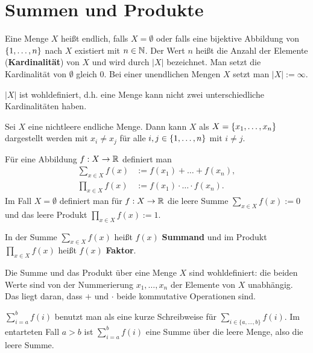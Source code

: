 \section{Summen und Produkte}

\begin{defn} 
Eine Menge $ X $ heißt endlich, falls $ X = \emptyset $ oder falls eine bijektive Abbildung von $ \{ 1,\ldots,n \} $ nach $ X $ existiert mit $ n \in \mathbb{N} $. Der Wert $ n $ heißt die Anzahl der Elemente (\textbf{Kardinalität}) von $ X $ und wird durch $ |X| $ bezeichnet. Man setzt die Kardinalität von $ \emptyset $ gleich 0. Bei einer unendlichen Mengen $X$ setzt man $|X| := \infty$. 
\end{defn} 

\begin{bem}
$ |X| $ ist wohldefiniert, d.h. eine Menge kann nicht zwei unterschiedliche Kardinalitäten haben.
\end{bem} 

\begin{defn}
Sei $ X $ eine nichtleere endliche Menge. Dann kann $ X $ als $ X = \{ x_1,\ldots,x_n \} $ dargestellt werden mit  $ x_i \neq x_j $ für alle $ i,j \in \{ 1,\ldots,n \} $ mit $i \ne j$. 

Für eine Abbildung $ f : X \to \mathbb{R} $ definiert man
\begin{align*}
	\sum\limits_{x \in X} f(x) &:= f(x_1) + \ldots + f(x_n),
\\
	\prod\limits_{x \in X} f(x) &:= f(x_1) \cdot \ldots \cdot f(x_n).
\end{align*}
Im Fall $ X = \emptyset $ definiert man für $ f : X \to \mathbb{R} $ die leere Summe $ \sum\limits_{x \in X} f(x) := 0 $ und das leere Produkt $ \prod\limits_{x \in X} f(x) := 1 $.

In der Summe $\sum\limits_{x \in X} f(x)$ heißt $f(x)$ \textbf{Summand} und im Produkt $\prod\limits_{x \in X} f(x)$ heißt $f(x)$ \textbf{Faktor}.  
\end{defn}

\begin{bem} 
	Die Summe und das Produkt über eine Menge $X$ sind wohldefiniert: die beiden Werte sind von der Nummerierung $x_1,\ldots,x_n$ der Elemente von $X$ unabhängig. Das liegt daran, dass $+$ und $\cdot$ beide kommutative Operationen sind. 
\end{bem} 


\begin{bem}
	$\sum\limits_{i=a}^b f(i)$ benutzt man als eine kurze Schreibweise für $\sum\limits_{i \in \{a,\ldots,b\}} f(i)$. Im entarteten Fall $a>b$ ist $\sum\limits_{i =a}^b f(i)$ eine Summe über die leere Menge, also die leere Summe.
\end{bem} 

